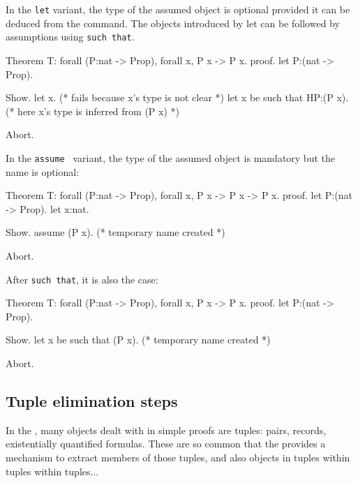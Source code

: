 In the {\tt let} variant, the type of the assumed object is optional
provided it can be deduced from the command. The objects introduced by
let can be followed by assumptions using {\tt such that}.

\begin{coq_eval}
Theorem T: forall (P:nat -> Prop), forall x, P x -> P x.
proof.
let P:(nat -> Prop).
\end{coq_eval} 
\begin{coq_example}
Show.
let x. (* fails because x's type is not clear *) 
let x be such that HP:(P x). (* here x's type is inferred from (P x) *)
\end{coq_example}
\begin{coq_eval}
Abort.
\end{coq_eval}

In the {\tt assume } variant, the type of the assumed object is mandatory
but the name is optional:

\begin{coq_eval}
Theorem T: forall (P:nat -> Prop), forall x, P x -> P x -> P x.
proof.
let P:(nat -> Prop).
let x:nat.
\end{coq_eval} 
\begin{coq_example}
Show.
assume (P x). (* temporary name created *)
\end{coq_example}
\begin{coq_eval}
Abort.
\end{coq_eval}

After {\tt such that}, it is also the case:

\begin{coq_eval}
Theorem T: forall (P:nat -> Prop), forall x, P x -> P x.
proof.
let P:(nat -> Prop).
\end{coq_eval} 
\begin{coq_example}
Show.
let x be such that (P x). (* temporary name created *)
\end{coq_example}
\begin{coq_eval}
Abort.
\end{coq_eval}

\subsection{Tuple elimination steps}

In the \CIC, many objects dealt with in simple proofs are tuples:
pairs, records, existentially quantified formulas. These are so
common that the \DPL{} provides a mechanism to extract members of
those tuples, and also objects in tuples within tuples within
tuples...

